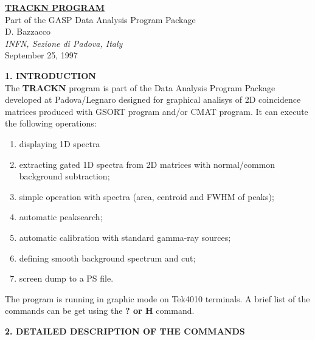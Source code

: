 \textwidth15cm
\parindent1cm


\begin{center}
{\Large\bf\underline{TRACKN PROGRAM}} \\
\bigskip
Part of the GASP Data Analysis Program Package\\
\bigskip
\bigskip
{D. Bazzacco} \\
\bigskip
{\small\it INFN, Sezione di Padova, Italy}\\
\bigskip
September 25, 1997
\end{center}

\bigskip
\bigskip
\bigskip

\noindent
{\large\bf 1. INTRODUCTION} \\

\bigskip
The {\bf TRACKN} program is part of the Data Analysis Program Package developed
at Padova/Legnaro designed for graphical analisys of 2D coincidence matrices
produced with GSORT program and/or CMAT program.
It can execute the following operations:
\begin{enumerate}
\item displaying 1D spectra
\item extracting gated 1D spectra from 2D matrices with normal/common
	background subtraction;
\item simple operation with spectra (area, centroid and FWHM of peaks);
\item automatic peaksearch;
\item automatic calibration with standard gamma-ray sources;
\item defining smooth background spectrum and cut;
\item screen dump to a PS file.
\end{enumerate}

The program is running in graphic mode on Tek4010 terminals.
A brief list of the commands can be get using the {\bf ? or H} command. 

\newpage
\noindent
{\large\bf 2. DETAILED DESCRIPTION OF THE COMMANDS} \\

\bigskip
\bigskip     

